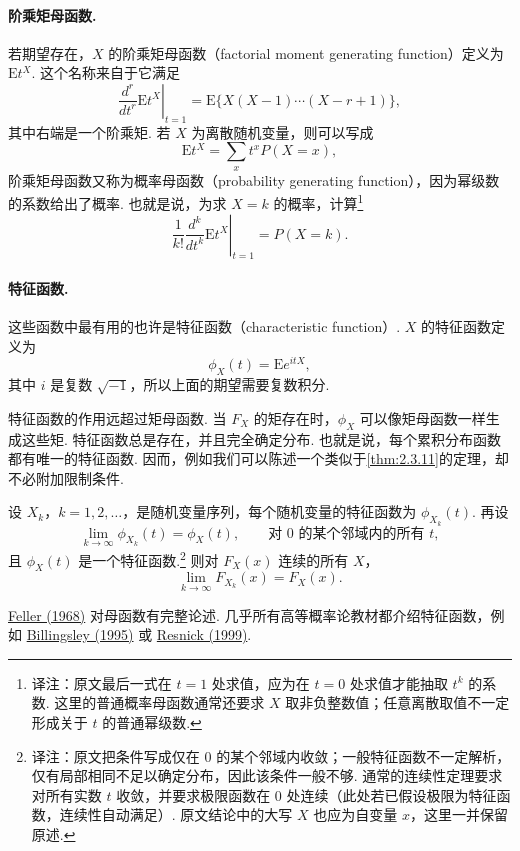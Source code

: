 \paragraph{阶乘矩母函数.}
若期望存在，$X$ 的阶乘矩母函数（factorial moment generating function）定义为 $\mathrm Et^X$. 这个名称来自于它满足
$$\left.\frac{d^r}{dt^r}\mathrm Et^X\right|_{t=1}
=\mathrm E\{X(X-1)\cdots(X-r+1)\},$$
其中右端是一个阶乘矩. 若 $X$ 为离散随机变量，则可以写成
$$\mathrm Et^X=\sum_x t^xP(X=x),$$
阶乘矩母函数又称为概率母函数（probability generating function），因为幂级数的系数给出了概率. 也就是说，为求 $X=k$ 的概率，计算\footnote{译注：原文最后一式在 $t=1$ 处求值，应为在 $t=0$ 处求值才能抽取 $t^k$ 的系数. 这里的普通概率母函数通常还要求 $X$ 取非负整数值；任意离散取值不一定形成关于 $t$ 的普通幂级数.}
$$\left.\frac1{k!}\frac{d^k}{dt^k}\mathrm Et^X\right|_{t=1}=P(X=k).$$


\paragraph{特征函数.}
这些函数中最有用的也许是特征函数（characteristic function）. $X$ 的特征函数定义为
$$\phi_X(t)=\mathrm Ee^{itX},$$
其中 $i$ 是复数 $\sqrt{-1}$，所以上面的期望需要复数积分.

特征函数的作用远超过矩母函数. 当 $F_X$ 的矩存在时，$\phi_X$ 可以像矩母函数一样生成这些矩. 特征函数总是存在，并且完全确定分布. 也就是说，每个累积分布函数都有唯一的特征函数. 因而，例如我们可以陈述一个类似于\autoref{thm:2.3.11}的定理，却不必附加限制条件.

\begin{theorem}[特征函数的收敛]\label{thm:2.6.1}
设 $X_k$，$k=1,2,\ldots$，是随机变量序列，每个随机变量的特征函数为 $\phi_{X_k}(t)$. 再设
$$\lim_{k\to\infty}\phi_{X_k}(t)=\phi_X(t),\qquad\text{对 $0$ 的某个邻域内的所有 $t$},$$
且 $\phi_X(t)$ 是一个特征函数.\footnote{译注：原文把条件写成仅在 $0$ 的某个邻域内收敛；一般特征函数不一定解析，仅有局部相同不足以确定分布，因此该条件一般不够. 通常的连续性定理要求对所有实数 $t$ 收敛，并要求极限函数在 $0$ 处连续（此处若已假设极限为特征函数，连续性自动满足）. 原文结论中的大写 $X$ 也应为自变量 $x$，这里一并保留原述.} 则对 $F_X(x)$ 连续的所有 $X$，
$$\lim_{k\to\infty}F_{X_k}(x)=F_X(x).$$
\end{theorem}


\hyperref[bib:source118]{Feller (1968)} 对母函数有完整论述. 几乎所有高等概率论教材都介绍特征函数，例如 \hyperref[bib:source33]{Billingsley (1995)} 或 \hyperref[bib:source251]{Resnick (1999)}.

